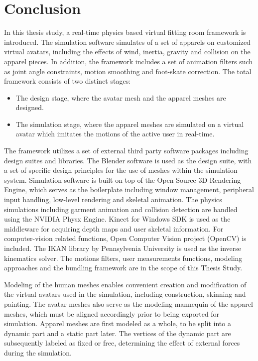 \chapter{Conclusion}
\label{chapter_conclusion}

In this thesis study, a real-time physics based virtual fitting room framework is introduced. The simulation software simulates of a set of apparels on customized virtual avatars, including the effects of wind, inertia, gravity and collision on the apparel pieces. In addition, the framework includes a set of animation filters such as joint angle constraints, motion smoothing and foot-skate correction. The total framework consists of two distinct stages:

\begin{itemize}
  \item The design stage, where the avatar mesh and the apparel meshes are designed. 
  \item The simulation stage, where the apparel meshes are simulated on a virtual avatar which imitates the motions of the active user in real-time.   
\end{itemize}

The framework utilizes a set of external third party software packages including design suites and libraries. The Blender software\cite{Blender} is used as the design suite, with a set of specific design principles for the use of meshes within the simulation system. Simulation software is built on top of the Open-Source 3D Rendering Engine\cite{Knot2012}, which serves as the boilerplate including window management, peripheral input handling, low-level rendering and skeletal animation. The physics simulations including garment animation and collision detection are handled using the NVIDIA Physx Engine\cite{WikiPhysx2012}. Kinect for 
Windows SDK\cite{Microsoft2013} is used as the middleware for acquiring depth maps and user skeletal information. For computer-vision related functions, Open Computer Vision project (OpenCV) \cite{opencv_library} is included. The IKAN library by Pennsylvenia University is used as the inverse kinematics solver\cite{IKAN2013}. The motions filters, user measurements functions, modeling approaches and the bundling framework are in the scope of this Thesis Study. 

Modeling of the human meshes enables convenient creation and modification of the virtual avatars used in the simulation, including construction, skinning and painting. The avatar meshes also serve as the modeling mannequin of the apparel meshes, which must be aligned accordingly prior to being exported for simulation. Apparel meshes are first modeled as a whole, to be split into a dynamic part and a static part later. The vertices of the dynamic part are subsequently labeled as fixed or free, determining the effect of external forces during the simulation.

